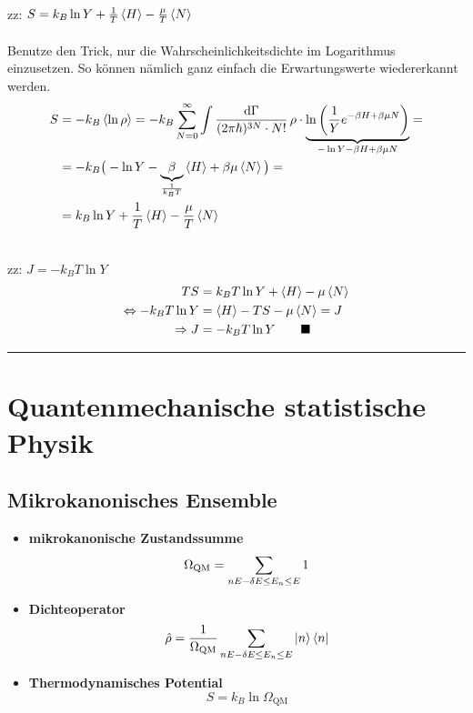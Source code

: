 \documentclass{article}
\newcommand{\diff}{\mathrm{d}}
\newcommand{\lr}[1]{\left(#1\right)}
\begin{document}
{	\\
	zz: $S = k_B \ln Y + \frac{1}{T} \braket{H} - \frac{\mu}{T} \braket{N}$\\
	\\
	Benutze den Trick, nur die Wahrscheinlichkeitsdichte im Logarithmus einzusetzen. So können nämlich ganz einfach die Erwartungswerte wiedererkannt werden.
		\begin{align*}
			S &= -k_B\braket{\ln\rho} = -k_B \sum_{N=0}^\infty \int \frac{\diff\Gamma}{(2\pi\hbar)^{3N} \cdot N!}\, \rho \cdot \underbrace{\ln\lr{ \frac{1}{Y} e^{-\beta H + \beta\mu N} } }_{-\ln Y - \beta H + \beta\mu N} = \\
			&= -k_B \big(-\ln Y - \underbrace{\beta}_{\frac{1}{k_B T}} \braket{H} + \beta\mu \braket{N} \big) = \\
			&= k_B\ln Y + \frac{1}{T} \braket{H} - \frac{\mu}{T} \braket{N}
		\end{align*}

	
	\\
	zz: $J = -k_B T \ln Y$
		\begin{align*}
			TS &= k_B T \ln Y + \braket{H} - \mu \braket{N} \\
			\Leftrightarrow -k_B T \ln Y &= \braket{H} - TS - \mu \braket{N} = J \\
			\Rightarrow J &= -k_B T \ln Y \qquad \blacksquare
		\end{align*}
\hrule
}


\newpage


\section{Quantenmechanische statistische Physik}
\subsection{Mikrokanonisches Ensemble}
	\begin{itemize}
		\item \textbf{mikrokanonische Zustandssumme}
			\begin{equation}
				\Omega_\text{QM} = \sum_{n\\ E-\delta E \leq E_n \leq E} 1
			\end{equation}
		
		
		\item \textbf{Dichteoperator}
			\begin{equation}
				\hat{\rho} = \frac{1}{\Omega_\text{QM}} \sum_{n\\ E-\delta E \leq E_n \leq E} \ket{n}\bra{n}
			\end{equation}
		
		
		\item \textbf{Thermodynamisches Potential}
			\begin{equation}
				S = k_B \ln \Omega_\text{QM}
			\end{equation}
	\end{itemize}
\end{document}
